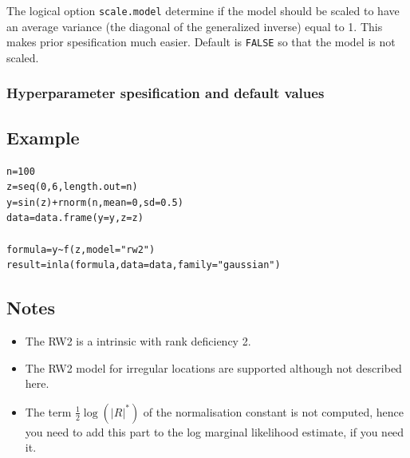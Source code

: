 \documentclass[a4paper,11pt]{article}
\begin{document}
The logical option \verb|scale.model| determine if the model should be
scaled to have an average variance (the diagonal of the generalized
inverse) equal to 1. This makes prior spesification much
easier. Default is \verb|FALSE| so that the model is not scaled.


\subsubsection*{Hyperparameter spesification and default values}



\subsection*{Example}

\begin{verbatim}
n=100
z=seq(0,6,length.out=n)
y=sin(z)+rnorm(n,mean=0,sd=0.5)
data=data.frame(y=y,z=z)

formula=y~f(z,model="rw2")
result=inla(formula,data=data,family="gaussian")
\end{verbatim}


\subsection*{Notes}

\begin{itemize}
\item The RW2 is a intrinsic with rank deficiency 2.
\item The RW2 model for irregular locations are supported although not
    described here.
\item The term $\frac{1}{2}\log(|R|^{*})$ of the normalisation
    constant is not computed, hence you need to add this part to the
    log marginal likelihood estimate, if you need it.
\end{itemize}
\end{document}
